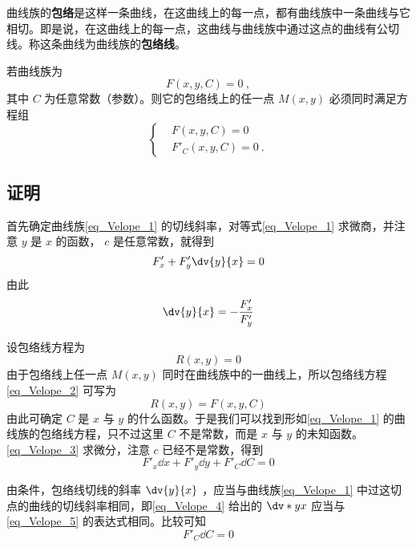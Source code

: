 曲线族的\textbf{包络}是这样一条曲线，在这曲线上的每一点，都有曲线族中一条曲线与它相切。即是说，在这曲线上的每一点，这曲线与曲线族中通过这点的曲线有公切线。称这条曲线为曲线族的\textbf{包络线}。

若曲线族为 
\begin{equation}\label{eq_Velope_1}
F(x,y,C)=0~,
\end{equation}
其中 $C$ 为任意常数（参数）。则它的包络线上的任一点 $M(x,y)$ 必须同时满足方程组
\begin{equation}\label{eq_Velope_6}
\left\{\begin{aligned}
&F(x,y,C)=0\\
&F'_C(x,y,C)=0
~.\end{aligned}\right.
\end{equation}
\subsection{证明}
首先确定曲线族\autoref{eq_Velope_1} 的切线斜率，对等式\autoref{eq_Velope_1} 求微商，并注意 $y$ 是 $x$ 的函数， $c$ 是任意常数，就得到
\begin{equation}
F'_x+F'_y\dv{y}{x}=0
\end{equation}
由此
\begin{equation}\label{eq_Velope_5}
\dv{y}{x}=-\frac{F'_x}{F'_y}
\end{equation}

设包络线方程为
\begin{equation}\label{eq_Velope_2}
R(x,y)=0
\end{equation}
由于包络线上任一点 $M(x,y)$ 同时在曲线族中的一曲线上，所以包络线方程\autoref{eq_Velope_2} 可写为
\begin{equation}\label{eq_Velope_3}
R(x,y)=F(x,y,C)
\end{equation}
由此可确定 $C$ 是 $x$ 与 $y$ 的什么函数。于是我们可以找到形如\autoref{eq_Velope_1} 的曲线族的包络线方程，只不过这里 $C$ 不是常数，而是 $x$ 与 $y$ 的未知函数。\autoref{eq_Velope_3} 求微分，注意 $c$ 已经不是常数，得到
\begin{equation}\label{eq_Velope_4}
F'_x\dd x+F'_y\dd y+F'_C\dd C=0
\end{equation}

由条件，包络线切线的斜率 $\dv{y}{x}$ ，应当与曲线族\autoref{eq_Velope_1} 中过这切点的曲线的切线斜率相同，即\autoref{eq_Velope_4} 给出的 $\dv*{y}{x}$ 应当与\autoref{eq_Velope_5} 的表达式相同。比较可知
\begin{equation}
F'_C\dd C=0
\end{equation}

